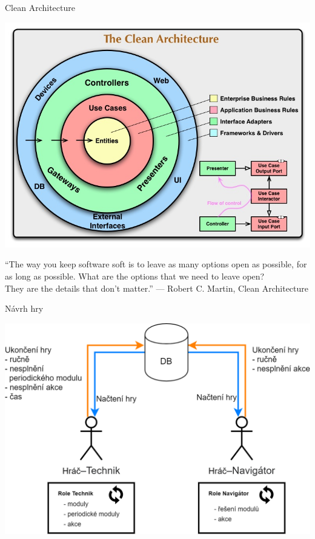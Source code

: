 \documentclass[czech,aspectratio=169]{beamer}
\begin{document}
  \begin{frame}{Clean Architecture}
    \begin{center}
      \includegraphics[width=.6\textwidth]{assets/slides/logo-clean-architecture}
    \end{center}
  \end{frame}

  \begin{frame}
      \begin{center}
        {\large ``The way you keep software soft is
      to leave as many options open as possible,
      for as long as possible.
      What are the options that we need to leave open?\\
      They are the details
      that don’t matter.''}
      \vskip5mm
      --- Robert C. Martin, Clean Architecture
      \end{center}
  \end{frame}

  \begin{frame}{Návrh hry}
    \begin{center}
      \includegraphics[width=.6\textwidth]{assets/slides/event-loop}
    \end{center}
  \end{frame}
\end{document}
